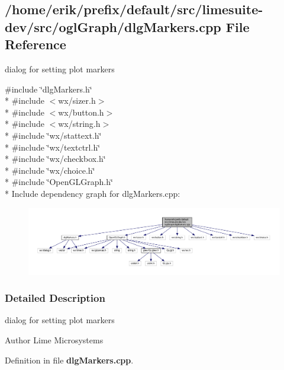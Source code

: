 \subsection{/home/erik/prefix/default/src/limesuite-\/dev/src/ogl\+Graph/dlg\+Markers.cpp File Reference}
\label{dlgMarkers_8cpp}


dialog for setting plot markers  


{\ttfamily \#include \char`\"{}dlg\+Markers.\+h\char`\"{}}\\*
{\ttfamily \#include $<$wx/sizer.\+h$>$}\\*
{\ttfamily \#include $<$wx/button.\+h$>$}\\*
{\ttfamily \#include $<$wx/string.\+h$>$}\\*
{\ttfamily \#include \char`\"{}wx/stattext.\+h\char`\"{}}\\*
{\ttfamily \#include \char`\"{}wx/textctrl.\+h\char`\"{}}\\*
{\ttfamily \#include \char`\"{}wx/checkbox.\+h\char`\"{}}\\*
{\ttfamily \#include \char`\"{}wx/choice.\+h\char`\"{}}\\*
{\ttfamily \#include \char`\"{}Open\+G\+L\+Graph.\+h\char`\"{}}\\*
Include dependency graph for dlg\+Markers.\+cpp\+:
\nopagebreak
\begin{figure}[H]
\begin{center}
\leavevmode
\includegraphics[width=350pt]{d4/d82/dlgMarkers_8cpp__incl}
\end{center}
\end{figure}


\subsubsection{Detailed Description}
dialog for setting plot markers 

\begin{DoxyAuthor}{Author}
Lime Microsystems 
\end{DoxyAuthor}


Definition in file {\bf dlg\+Markers.\+cpp}.


